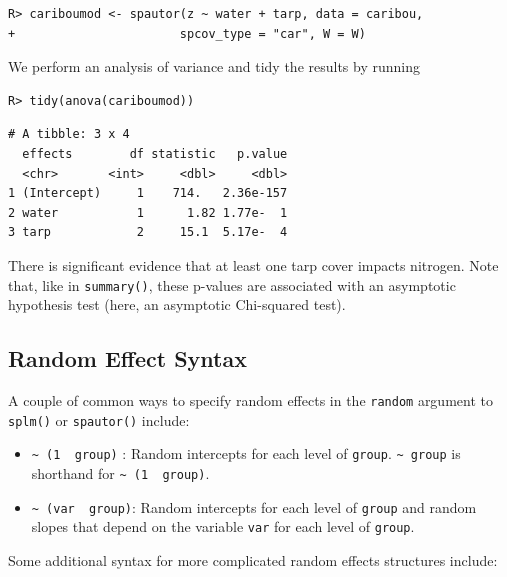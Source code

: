 \documentclass{article}
\providecommand{\tightlist}{%
  \setlength{\itemsep}{0pt}\setlength{\parskip}{0pt}}
\begin{document}
\begin{verbatim}
R> cariboumod <- spautor(z ~ water + tarp, data = caribou,
+                       spcov_type = "car", W = W)
\end{verbatim}

We perform an analysis of variance and tidy the results by running

\begin{verbatim}
R> tidy(anova(cariboumod))
\end{verbatim}

\begin{verbatim}
# A tibble: 3 x 4
  effects        df statistic   p.value
  <chr>       <int>     <dbl>     <dbl>
1 (Intercept)     1    714.   2.36e-157
2 water           1      1.82 1.77e-  1
3 tarp            2     15.1  5.17e-  4
\end{verbatim}

There is significant evidence that at least one tarp cover impacts
nitrogen. Note that, like in \texttt{summary()}, these p-values are
associated with an asymptotic hypothesis test (here, an asymptotic
Chi-squared test).

\hypertarget{app:rand}{%
\subsection{Random Effect Syntax}\label{app:rand}}

A couple of common ways to specify random effects in the \texttt{random}
argument to \texttt{splm()} or \texttt{spautor()} include:

\begin{itemize}
\tightlist
\item
  \texttt{\textasciitilde{}\ (1\ \textbar{}\ group)} : Random intercepts
  for each level of \texttt{group}. \texttt{\textasciitilde{}\ group} is
  shorthand for \texttt{\textasciitilde{}\ (1\ \textbar{}\ group)}.
\item
  \texttt{\textasciitilde{}\ (var\ \textbar{}\ group)}: Random
  intercepts for each level of \texttt{group} and random slopes that
  depend on the variable \texttt{var} for each level of \texttt{group}.
\end{itemize}

Some additional syntax for more complicated random effects structures
include:
\end{document}
